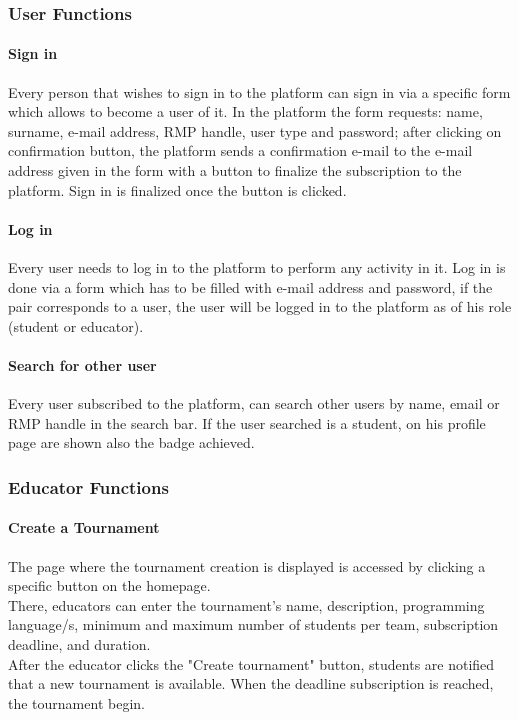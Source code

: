 \subsubsection{User Functions}

\paragraph{Sign in}
Every person that wishes to sign in to the platform can sign in via a specific form which allows to become a user of it.
In the platform the form requests: name, surname, e-mail address, RMP handle, user type and password; after clicking on confirmation button, the platform sends a confirmation e-mail to the e-mail address given in the form with a 
button to finalize the subscription to the platform. Sign in is finalized once the button is clicked.
\paragraph{Log in}
Every user needs to log in to the platform to perform any activity in it. Log in is done via a form which has to be filled with e-mail address and password, if the pair corresponds to a user, the user will be logged in to the 
platform as of his role (student or educator).
\paragraph{Search for other user}
Every user subscribed to the platform, can search other users by name, email or RMP handle in the search bar. If the user searched is a student, on his profile page are shown also the badge achieved.

\subsubsection{Educator Functions}

\paragraph{Create a Tournament}
The page where the tournament creation is displayed is accessed by clicking a specific button on the homepage.\\
There, educators can enter the tournament's name, description, programming language/s, minimum and maximum number of students per team, subscription deadline, and duration.\\ 
After the educator clicks the "Create tournament" button, students are notified that a new tournament is available.
When the deadline subscription is reached, the tournament begin.

